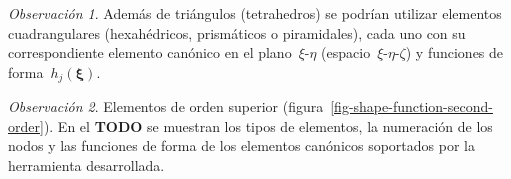 \documentclass[
  12pt,
  a4paper,
  table]{scrbook}
\theoremstyle{plain}
\theoremstyle{definition}
\theoremstyle{plain}
\theoremstyle{plain}
\theoremstyle{remark}
\newtheorem*{remark}{Observación}
\begin{document}
\begin{remark}

Además de triángulos (tetrahedros) se podrían utilizar elementos
cuadrangulares (hexahédricos, prismáticos o piramidales), cada uno con
su correspondiente elemento canónico en el plano~\(\xi\)-\(\eta\)
(espacio~\(\xi\)-\(\eta\)-\(\zeta\)) y funciones de
forma~\(h_j(\symbf{\xi})\).

\end{remark}

\begin{remark}

Elementos de orden superior
(figura~\ref{fig-shape-function-second-order}). En el \textbf{TODO} se
muestran los tipos de elementos, la numeración de los nodos y las
funciones de forma de los elementos canónicos soportados por la
herramienta desarrollada.

\end{remark}
\end{document}
